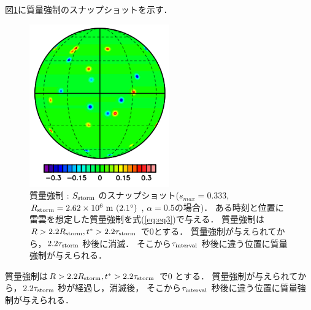 \documentclass[a4j,12pt,openbib,oneside]{jreport}
\begin{document}
図\ref{fig5}に質量強制のスナップショットを示す．
%
\begin{figure}[t]
  \begin{center}
    \includegraphics[clip,width=6cm]{./fig/model/fig5_v2.png}
    \caption{
      \footnotesize{質量強制 : $S_{{\rm{storm}}}$ のスナップショット($s_{max} = 0.333$, $R_{{\rm{storm}}} = 2.62 \times 10^6 {\rm{~m~}}(2.1^{\circ})$
, $\alpha = 0.5$の場合)．
ある時刻と位置に雷雲を想定した質量強制を式(\ref{eq:eq3})で与える．
質量強制は$R > 2.2 R_{{\rm{storm}}}, t^* > 2.2 \tau_{{\rm{storm}}}$ で0とする．
質量強制が与えられてから，$2.2 \tau_{{\rm{storm}}}$ 秒後に消滅．
そこから$\tau_{{\rm{interval}}}$ 秒後に違う位置に質量強制が与えられる．
      }
    }
    \label{fig5}
  \end{center}
\end{figure}
%
質量強制は$R > 2.2 R_{{\rm{storm}}}, t^* > 2.2 \tau_{{\rm{storm}}}$ で0 とする．
質量強制が与えられてから，$2.2 \tau_{{\rm{storm}}}$ 秒が経過し，消滅後，
そこから$\tau_{{\rm{interval}}}$ 秒後に違う位置に質量強制が与えられる．
\end{document}
